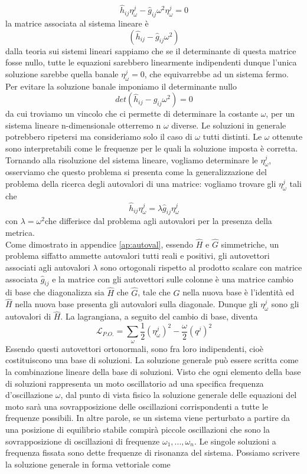 \documentclass[
10pt, %
a4paper, %
oneside, %
headinclude,footinclude, %
BCOR5mm, %
]{scrartcl}
\begin{document}
\[\hat{h}_{ij}\eta_{\omega}^j-\hat{g}_{ij}\omega^2\eta_{\omega}^j = 0\]
la matrice associata al sistema lineare è
\[\left(\hat{h}_{ij}-\hat{g}_{ij}\omega^2\right)\]
dalla teoria sui sistemi lineari sappiamo che se il determinante di questa matrice fosse nullo, tutte le equazioni sarebbero linearmente indipendenti dunque l'unica soluzione sarebbe quella banale \(\eta_{\omega}^j = 0\), che equivarrebbe ad un sistema fermo. Per evitare la soluzione banale imponiamo il determinante nullo
\[det\left(\hat{h}_{ij}-\hat{g}_{ij}\omega^2\right) = 0\]
da cui troviamo un vincolo che ci permette di determinare la costante $\omega$, per un sistema lineare n-dimensionale otterremo n $\omega$ diverse. Le soluzioni in generale potrebbero ripetersi ma consideriamo solo il caso di $\omega$ tutti distinti. Le $\omega$ ottenute sono interpretabili come le frequenze per le quali la soluzione imposta è corretta.\\
Tornando alla risoluzione del sistema lineare, vogliamo determinare le \(\eta_{\omega}^j\), osserviamo che questo problema si presenta come la generalizzazione del problema della ricerca degli autovalori di una matrice: vogliamo trovare gli \(\eta_{\omega}^j\) tali che
\[\hat{h}_{ij}\eta_{\omega}^j = \lambda \hat{g}_{ij}\eta_{\omega}^j\]
con \(\lambda = \omega^2\)che differisce dal problema agli autovalori per la presenza della metrica.\\
Come dimostrato in appendice \ref{ap:autoval}, essendo $\hat{H}$ e \(\hat{G}\) simmetriche, un problema siffatto ammette autovalori tutti reali e positivi, gli autovettori associati agli autovalori $\lambda$ sono ortogonali rispetto al prodotto scalare con matrice associata $\hat{g}_{ij}$ e la matrice con gli autovettori sulle colonne è una matrice cambio di base che diagonalizza sia $\hat{H}$ che $\hat{G}$, tale che $\hat{G}$ nella nuova base è l'identità ed $\hat{H}$ nella nuova base presenta gli autovalori sulla diagonale. Dunque gli \(\eta_{\omega}^j\) sono gli autovalori di \(\hat{H}\). La lagrangiana, a seguito del cambio di base, diventa
\[\mathcal{L}_{P.O.} = \sum_\omega\frac{1}{2} (\eta^j_\omega)^2-\frac{\omega}{2}(q^j)^2\]
Essendo questi autovettori ortonormali, sono fra loro indipendenti, cioè costituiscono una base di soluzioni. La soluzione generale può essere scritta come la combinazione lineare della base di soluzioni. Visto che ogni elemento della base di soluzioni rappresenta un moto oscillatorio ad una specifica frequenza d'oscillazione \(\omega\), dal punto di vista fisico la soluzione generale delle equazioni del moto sarà una sovrapposizione delle oscillazioni corrispondenti a tutte le frequenze possibili. In altre parole, se un sistema viene perturbato a partire da una posizione di equilibrio stabile compirà piccole oscillazioni che sono la sovrapposizione di oscillazioni di frequenze $\omega_1, ..., \omega_n$. Le singole soluzioni a frequenza fissata sono dette frequenze di risonanza del sistema. Possiamo scrivere la soluzione generale in forma vettoriale come
\end{document}
